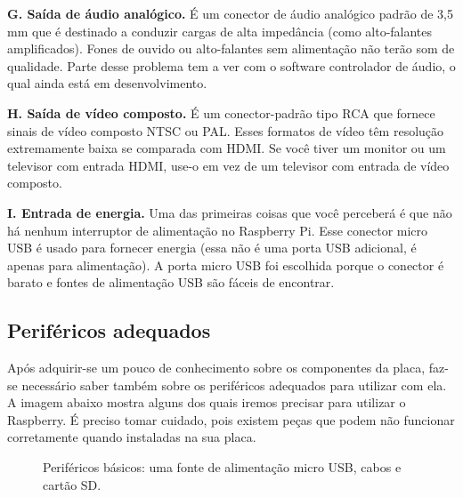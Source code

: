 \textbf{G. Saída de áudio analógico.} É um conector de áudio analógico padrão de 3,5 mm que é destinado a conduzir cargas de alta impedância (como alto-falantes amplificados). Fones de ouvido ou alto-falantes sem alimentação não terão som de qualidade. Parte desse problema tem a ver com o software controlador de áudio, o qual ainda está em desenvolvimento.

\textbf{H. Saída de vídeo composto.} É um conector-padrão tipo RCA que fornece sinais de vídeo composto NTSC ou PAL. Esses formatos de vídeo têm resolução extremamente baixa se comparada com HDMI. Se você tiver um monitor ou um televisor com entrada HDMI, use-o em vez de um televisor com entrada de vídeo composto.

\textbf{I. Entrada de energia.} Uma das primeiras coisas que você perceberá é que não há nenhum interruptor de alimentação no Raspberry Pi. Esse conector micro USB é usado para fornecer energia (essa não é uma porta USB adicional, é apenas para alimentação). A porta micro USB foi escolhida porque o conector é barato e fontes de alimentação USB são fáceis de encontrar.

\newpage

\subsection{Periféricos adequados}

Após adquirir-se um pouco de conhecimento sobre os componentes da placa, faz-se necessário saber também sobre os periféricos adequados para utilizar com ela. A imagem abaixo mostra alguns dos quais iremos precisar para utilizar o Raspberry. É preciso tomar cuidado, pois existem peças que podem não funcionar corretamente quando instaladas na sua placa.

\begin{figure}[ht]
    \centering
    \caption{Periféricos básicos: uma fonte de alimentação micro USB, cabos e cartão SD.}
\end{figure}


